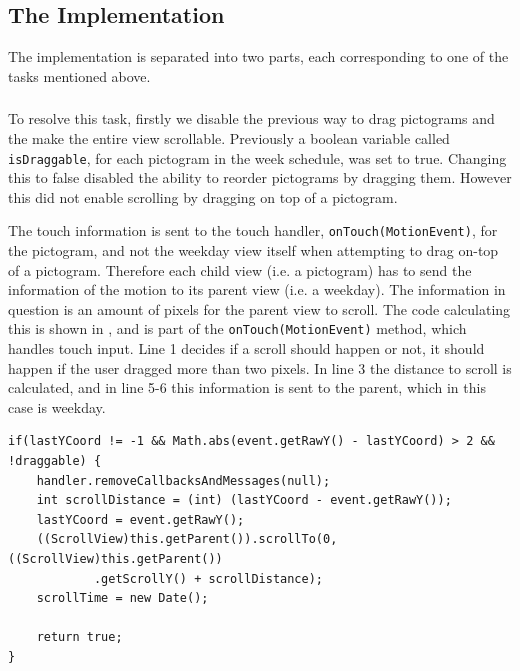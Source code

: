 \subsection*{The Implementation}
The implementation is separated into two parts, each corresponding to one of the tasks mentioned above. 
\subsubsection*{} 
To resolve this task, firstly we disable the previous way to drag pictograms and the make the entire view scrollable. 
Previously a boolean variable called \texttt{isDraggable}, for each pictogram in the week schedule, was set to true. 
Changing this to false disabled the ability to reorder pictograms by dragging them. 
However this did not enable scrolling by dragging on top of a pictogram. 

The touch information is sent to the touch handler, \texttt{onTouch(MotionEvent)}, for the pictogram, and not the weekday view itself when attempting to drag on-top of a pictogram. 
Therefore each child view (i.e. a pictogram) has to send the information of the motion to its parent view (i.e. a weekday). 
The information in question is an amount of pixels for the parent view to scroll. 
The code calculating this is shown in , and is part of the \texttt{onTouch(MotionEvent)} method, which handles touch input. 
Line 1 decides if a scroll should happen or not, it should happen if the user dragged more than two pixels. 
In line 3 the distance to scroll is calculated, and in line 5-6 this information is sent to the parent, which in this case is weekday.  

\begin{lstlisting}[floatplacement=h, caption={The code executed when someone performs a move action.}, label={lst:actionmove}] 
if(lastYCoord != -1 && Math.abs(event.getRawY() - lastYCoord) > 2 && !draggable) {
    handler.removeCallbacksAndMessages(null);
    int scrollDistance = (int) (lastYCoord - event.getRawY());
    lastYCoord = event.getRawY();
    ((ScrollView)this.getParent()).scrollTo(0,((ScrollView)this.getParent())
            .getScrollY() + scrollDistance);
    scrollTime = new Date();

    return true;
}
\end{lstlisting}

